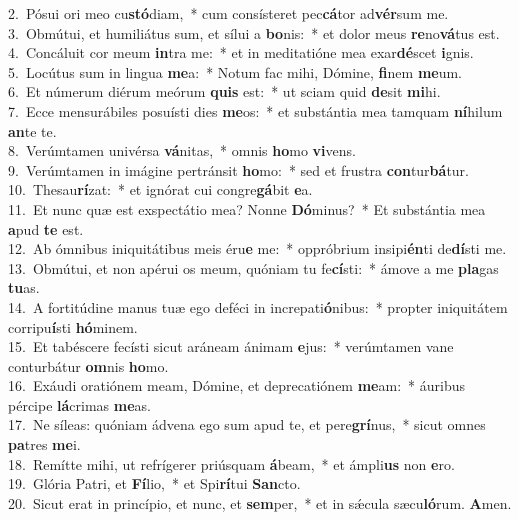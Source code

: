 {2.~}Pósui ori meo cu\textbf{stó}diam,~* cum consísteret pec\textbf{cá}tor ad\textbf{vér}sum me.\\
{3.~}Obmútui, et humiliátus sum, et sílui a \textbf{bo}nis:~* et dolor meus \textbf{re}no\textbf{vá}tus est.\\
{4.~}Concáluit cor meum \textbf{in}tra me:~* et in meditatióne mea exar\textbf{dé}scet \textbf{i}gnis.\\
{5.~}Locútus sum in lingua \textbf{me}a:~* Notum fac mihi, Dómine, \textbf{fi}nem \textbf{me}um.\\
{6.~}Et númerum diérum meórum \textbf{quis} est:~* ut sciam quid \textbf{de}sit \textbf{mi}hi.\\
{7.~}Ecce mensurábiles posuísti dies \textbf{me}os:~* et substántia mea tamquam \textbf{ní}hilum \textbf{an}te te.\\
{8.~}Verúmtamen univérsa \textbf{vá}nitas,~* omnis \textbf{ho}mo \textbf{vi}vens.\\
{9.~}Verúmtamen in imágine pertránsit \textbf{ho}mo:~* sed et frustra \textbf{con}tur\textbf{bá}tur.\\
{10.~}Thesau\textbf{rí}zat:~* et ignórat cui congre\textbf{gá}bit \textbf{e}a.\\
{11.~}Et nunc quæ est exspectátio mea? Nonne \textbf{Dó}minus?~* Et substántia mea \textbf{a}pud \textbf{te} est.\\
{12.~}Ab ómnibus iniquitátibus meis éru\textbf{e} me:~* oppróbrium insipi\textbf{én}ti de\textbf{dí}sti me.\\
{13.~}Obmútui, et non apérui os meum, quóniam tu fe\textbf{cí}sti:~* ámove a me \textbf{pla}gas \textbf{tu}as.\\
{14.~}A fortitúdine manus tuæ ego deféci in increpati\textbf{ó}nibus:~* propter iniquitátem corripu\textbf{í}sti \textbf{hó}minem.\\
{15.~}Et tabéscere fecísti sicut aráneam ánimam \textbf{e}jus:~* verúmtamen vane conturbátur \textbf{om}nis \textbf{ho}mo.\\
{16.~}Exáudi oratiónem meam, Dómine, et deprecatiónem \textbf{me}am:~* áuribus pércipe \textbf{lá}crimas \textbf{me}as.\\
{17.~}Ne síleas: quóniam ádvena ego sum apud te, et pere\textbf{grí}nus,~* sicut omnes \textbf{pa}tres \textbf{me}i.\\
{18.~}Remítte mihi, ut refrígerer priúsquam \textbf{á}beam,~* et ámpli\textbf{us} non \textbf{e}ro.\\
{19.~}Glória Patri, et \textbf{Fí}lio,~* et Spi\textbf{rí}tui \textbf{San}cto.\\
{20.~}Sicut erat in princípio, et nunc, et \textbf{sem}per,~* et in sǽcula sæcu\textbf{ló}rum. \textbf{A}men.\\
